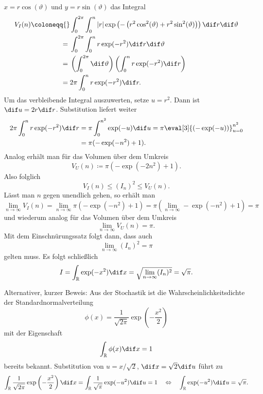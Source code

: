\documentclass{scrartcl}
\newcommand{\R}{\mathbb{R}}
\begin{document}
$ x = r \cos(\vartheta) $ und
$ y = r \sin(\vartheta) $ das Integral
\begin{align*}
V_{I}(n) \coloneqq{}& \int_{0}^{2\pi} \int_{0}^{n} |r|
      \exp\left(- \left( r^{2} \cos^{2}(\vartheta) + r^{2} \sin^{2}(\vartheta) \right) \right) 
      \dif r \dif \vartheta \\
={}& \int_{0}^{2\pi} \int_{0}^{n} r \exp(- r^{2} ) \dif r \dif \vartheta \\
={}& \left( \int_{0}^{2\pi} \dif \vartheta \right) 
            \left( \int_{0}^{n} r \exp(- r^{2} ) \dif r \right) \\
={}& 2\pi \int_{0}^{n} r \exp(- r^{2} ) \dif r .
\end{align*}
Um das verbleibende Integral auszuwerten, setze $ u = r^{2} $. Dann ist $ \dif u = 2r \dif r $. 
Substitution liefert weiter
\begin{align*}
   2\pi \int_{0}^{n} r \exp(- r^{2} ) \dif r
&= \pi \int_{0}^{n^{2}} \exp(- u ) \dif u
 = \pi \eval[3]{\left( -\exp(-u) \right)}_{u = 0}^{n^{2}} \\
&= \pi (-\exp(-n^{2}) + 1).
\end{align*}
Analog erhält man für das Volumen über dem Umkreis
\[
  V_{U}(n) \coloneqq \pi (-\exp(-2n^{2}) + 1).
\]
Also folglich
\[
  V_{I}(n) \leq (I_{n})^{2} \leq V_{U}(n).
\]
Lässt man $ n $ gegen unendlich gehen, so erhält man
\[
  \lim\limits_{n \to \infty} V_{I}(n)
 = \lim\limits_{n \to \infty} \pi (-\exp(-n^{2}) + 1)
 = \pi \left( \lim\limits_{n \to \infty} -\exp(-n^{2}) + 1 \right)
 = \pi
\]
und wiederum analog für das Volumen über dem Umkreis
\[
  \lim\limits_{n \to \infty} V_{U}(n) = \pi.
\]
Mit dem Einschnürungssatz folgt dann, dass auch
\[
  \lim\limits_{n \to \infty} (I_{n})^{2} = \pi
\]
gelten muss. Es folgt schließlich
\[
  I = \int_{\R} \exp(-x^{2}) \dif x = \sqrt{ \lim\limits_{n \to \infty} (I_{n})^{2} } = \sqrt{\pi}.
\]

Alternativer, kurzer Beweis: Aus der Stochastik ist die Wahrscheinlichkeitsdichte der 
Standardnormalverteilung
\[
  \phi(x) = \frac{1}{\sqrt{2 \pi}} \exp \left( - \frac{x^{2}}{2} \right)
\]
mit der Eigenschaft
\[
  \int_{\R} \phi(x) \dif x = 1
\]
bereits bekannt. Substitution von $ u = x / \sqrt{2} $, $ \dif x = \sqrt{2} \dif u $ führt zu
\[
    \int_{\R} \frac{1}{\sqrt{2 \pi}} \exp \left( - \frac{x^{2}}{2} \right) \dif x
  = \int_{\R} \frac{1}{\sqrt{\pi}} \exp(-u^{2}) \dif u
  = 1 \quad \Leftrightarrow \quad
    \int_{\R} \exp(-u^{2}) \dif u = \sqrt{\pi}.
\]
\end{document}
